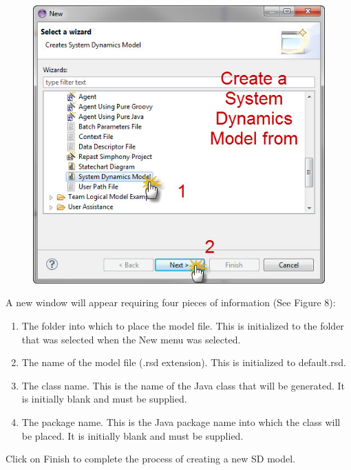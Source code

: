 \documentclass[11pt]{amsart}
\begin{document}
\begin{figure}[ht]
\begin{center}
\vspace{.2in}
\centerline {
\includegraphics[totalheight=0.35\textheight]{images/007.jpg}
}
\caption{}
\label{fig:007}
\end{center}
\end{figure}

A new window will appear requiring four pieces of information (See Figure 8):

\begin{enumerate}
\item The folder into which to place the model file. This is initialized to the folder that was selected when the New menu was selected.
\item The name of the model file (.rsd extension). This is initialized to default.rsd.
\item The class name. This is the name of the Java class that will be generated. It is initially blank and must be supplied.
\item The package name. This is the Java package name into which the class will be placed. It is initially blank and must be supplied.
\end{enumerate}
\vspace{.2in}

Click on Finish to complete the process of creating a new SD model.
\end{document}
